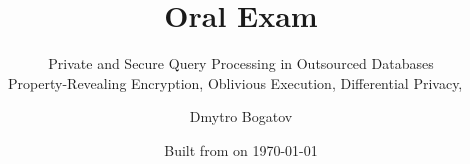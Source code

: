 \title{Oral Exam}

\subtitle{
	Private and Secure Query Processing in Outsourced Databases \\
	{\small Property-Revealing Encryption, Oblivious Execution, Differential Privacy, \epsolute{}~\cite{epsolute}}
}

\date{Built from \href{https://git.dbogatov.org/bu/oral-exam/commit/\version}{\emph{\version}} on \today}

\author{Dmytro Bogatov \\ }


\def\wm{\begin{tabular}{c} Dmytro Bogatov \\ Boston University \end{tabular}}
